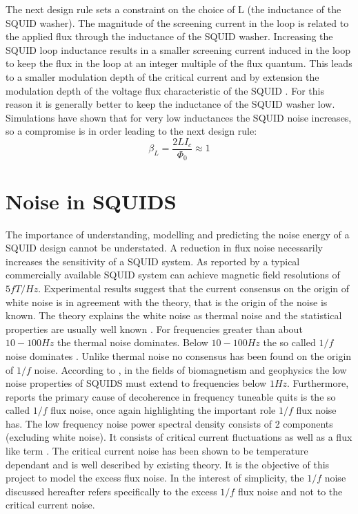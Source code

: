 The next design rule sets a constraint on the choice of L (the inductance of the SQUID washer). The magnitude of the screening current in the loop is related to the applied flux through the inductance of the SQUID washer. Increasing the SQUID loop inductance results in a smaller screening current induced in the loop to keep the flux in the loop at an integer multiple of the flux quantum. This leads to a smaller modulation depth of the critical current and by extension the modulation depth of the voltage flux characteristic of the SQUID \cite{Drung2016NBSQUIDS}. For this reason it is generally better to keep the inductance of the SQUID washer low. Simulations have shown that for very low inductances the SQUID noise increases, so a compromise is in order \cite{Drung2016NBSQUIDS} leading to the next design rule: 
\begin{equation}
    \beta_L = \frac{2LI_c}{\Phi_0} \approx 1
    \label{eq:SQUIDmodDepth}
\end{equation}

\section{Noise in SQUIDS}
\label{sec:noiseInSquids}
The importance of understanding, modelling and predicting the noise energy of a SQUID design cannot be understated. A reduction in flux noise necessarily increases the sensitivity of a SQUID system. As reported by \cite{LowNoiseGrad} a typical commercially available SQUID system can achieve magnetic field resolutions of $5 \si{fT/Hz}$. Experimental results suggest that the current consensus on the origin of white noise is in agreement with the theory, that is the origin of the noise is known. The theory explains the white noise as thermal noise and the statistical properties are usually well known \cite{Drung2016NBSQUIDS} \cite{SQUIDhandbook}. For frequencies greater than about $10 - 100\si{Hz}$ the thermal noise dominates. Below $10 - 100\si{Hz}$ the so called $1/f$ noise dominates \cite{DCSQUIDdesignImage}. Unlike thermal noise no consensus has been found on the origin of $1/f$ noise. According to \cite{SQUIDhandbook}, in the fields of biomagnetism and geophysics the low noise properties of SQUIDS must extend to frequencies below $1\si{Hz}$. Furthermore, \cite{QubitPerf} reports the primary cause of decoherence in frequency tuneable quits is the so called $1/f$ flux noise, once again highlighting the important role $1/f$ flux noise has. The low frequency noise power spectral density consists of 2 components (excluding white noise). It consists of critical current fluctuations as well as a flux like term \cite{FluxNoiseCol,fluxNoiseSquidsStevenAnton}. The critical current noise has been shown to be temperature dependant and is well described by existing theory. It is the objective of this project to model the excess flux noise. In the interest of simplicity, the $1/f$ noise discussed hereafter refers specifically to the excess $1/f$ flux noise and not to the critical current noise. 


